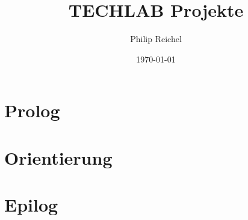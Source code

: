 \documentclass[12pt, a4paper]{book}
\title{TECHLAB Projekte}
\author{Philip Reichel}
\date{\today}
\begin{document}
\maketitle
\tableofcontents  %

\chapter{Prolog}
\chapter{Orientierung}


\chapter{Epilog}
\end{document}
